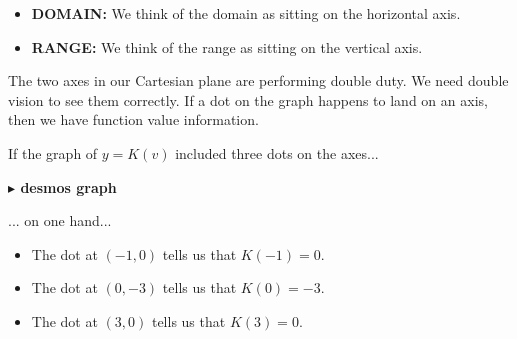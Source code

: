 \documentclass{ximera}
\begin{document}
\begin{itemize}
\item \textbf{DOMAIN:} We think of the domain as sitting on the horizontal axis.
\item \textbf{RANGE:} We think of the range as sitting on the vertical axis.
\end{itemize}


The two axes in our Cartesian plane are performing double duty.  We need double vision to see them correctly. If a dot on the graph happens to land on an axis, then we have function value information.

If the graph of $y=K(v)$ included three dots on the axes...

\begin{image}
\end{image}





\begin{onlineOnly}
\textbf{\textcolor{blue!55!black}{$\blacktriangleright$ desmos graph}} 
\begin{center}
\end{center}
\end{onlineOnly}


... on one hand...

\begin{itemize}
\item The dot at $(-1,0)$ tells us that $K(-1) = 0$.
\item The dot at $(0,-3)$ tells us that $K(0) = -3$.
\item The dot at $(3,0)$ tells us that $K(3) = 0$.
\end{itemize}
\end{document}
